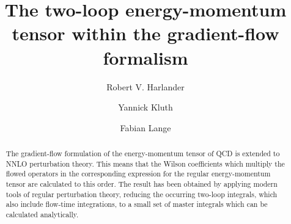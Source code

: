 \documentclass[11pt]{article}
\title{The two-loop energy-momentum tensor within the gradient-flow formalism}
\author{Robert V. Harlander \and Yannick Kluth \and Fabian Lange}
\date{}
\begin{document}
\maketitle
{}

\begin{abstract}
  The gradient-flow formulation of the energy-momentum tensor of
  QCD is extended to NNLO perturbation theory. This means that the
  Wilson coefficients which multiply the flowed operators in the
  corresponding expression for the regular energy-momentum tensor are
  calculated to this order. The result has been obtained by applying
  modern tools of regular perturbation theory, reducing the occurring
  two-loop integrals, which also include flow-time integrations, to a
  small set of master integrals which can be calculated analytically.
\end{abstract}
\newpage
\tableofcontents
\newpage










\end{document}
